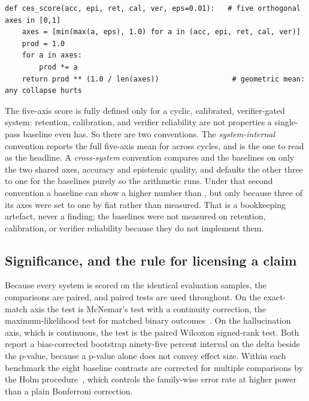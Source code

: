 \begin{lstlisting}[caption={The composite evaluation score, condensed from \texttt{eval/metrics.py}.}, label={lst:ces}]
def ces_score(acc, epi, ret, cal, ver, eps=0.01):   # five orthogonal axes in [0,1]
    axes = [min(max(a, eps), 1.0) for a in (acc, epi, ret, cal, ver)]
    prod = 1.0
    for a in axes:
        prod *= a
    return prod ** (1.0 / len(axes))                 # geometric mean: any collapse hurts
\end{lstlisting}

\begin{pitfall}
The five-axis score is fully defined only for a cyclic, calibrated, verifier-gated
system: retention, calibration, and verifier reliability are not properties a
single-pass baseline even has. So there are two conventions. The
\emph{system-internal} convention reports the full five-axis mean for \caem{} across
cycles, and is the one to read as the headline. A \emph{cross-system} convention
compares \caem{} and the baselines on only the two shared axes, accuracy and
epistemic quality, and defaults the other three to one for the baselines purely so
the arithmetic runs. Under that second convention a baseline can show a higher number
than \caem{}, but only because three of its axes were set to one by fiat rather than
measured. That is a bookkeeping artefact, never a finding; the baselines were not
measured on retention, calibration, or verifier reliability because they do not
implement them.
\end{pitfall}

\subsection*{Significance, and the rule for licensing a claim}

\begin{precise}
Because every system is scored on the identical evaluation samples, the comparisons
are paired, and paired tests are used throughout. On the exact-match axis the test is
McNemar's test with a continuity correction, the maximum-likelihood test for matched
binary outcomes~\cite{mcnemar1947note}. On the hallucination axis, which is
continuous, the test is the paired Wilcoxon signed-rank test. Both report a
bias-corrected bootstrap ninety-five percent interval on the delta beside the
p-value, because a p-value alone does not convey effect size. Within each benchmark
the eight baseline contrasts are corrected for multiple comparisons by the Holm
procedure~\cite{holm1979simple}, which controls the family-wise error rate at higher
power than a plain Bonferroni correction.
\end{precise}

